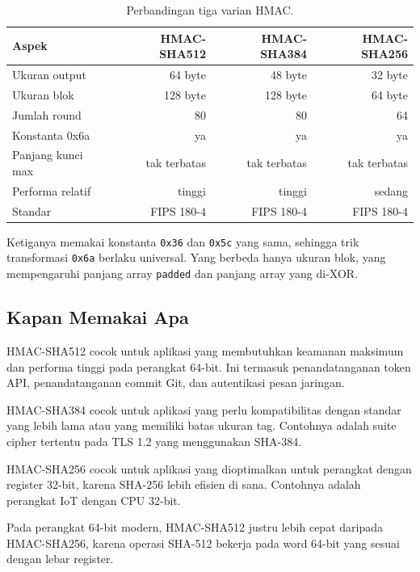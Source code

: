 \documentclass[11pt,a4paper]{article}
\begin{document}
\begin{table}[H]
	\centering
	\caption{Perbandingan tiga varian HMAC.}
	\label{tab:hmac-variants}
	\small
	\begin{tabularx}{\textwidth}{l r r r}
		\toprule
		Aspek             & HMAC-SHA512  & HMAC-SHA384  & HMAC-SHA256  \\
		\midrule
		Ukuran output     & 64 byte      & 48 byte      & 32 byte      \\
		Ukuran blok       & 128 byte     & 128 byte     & 64 byte      \\
		Jumlah round      & 80           & 80           & 64           \\
		Konstanta 0x6a    & ya           & ya           & ya           \\
		Panjang kunci max & tak terbatas & tak terbatas & tak terbatas \\
		Performa relatif  & tinggi       & tinggi       & sedang       \\
		Standar           & FIPS 180-4   & FIPS 180-4   & FIPS 180-4   \\
		\bottomrule
	\end{tabularx}
\end{table}

Ketiganya memakai konstanta \texttt{0x36} dan \texttt{0x5c} yang sama, sehingga trik transformasi \texttt{0x6a} berlaku universal. Yang berbeda hanya ukuran blok, yang mempengaruhi panjang array \texttt{padded} dan panjang array yang di-XOR.

\subsection{Kapan Memakai Apa}

HMAC-SHA512 cocok untuk aplikasi yang membutuhkan keamanan maksimum dan performa tinggi pada perangkat 64-bit. Ini termasuk penandatanganan token API, penandatanganan commit Git, dan autentikasi pesan jaringan.

HMAC-SHA384 cocok untuk aplikasi yang perlu kompatibilitas dengan standar yang lebih lama atau yang memiliki batas ukuran tag. Contohnya adalah suite cipher tertentu pada TLS 1.2 yang menggunakan SHA-384.

HMAC-SHA256 cocok untuk aplikasi yang dioptimalkan untuk perangkat dengan register 32-bit, karena SHA-256 lebih efisien di sana. Contohnya adalah perangkat IoT dengan CPU 32-bit.

Pada perangkat 64-bit modern, HMAC-SHA512 justru lebih cepat daripada HMAC-SHA256, karena operasi SHA-512 bekerja pada word 64-bit yang sesuai dengan lebar register.
\end{document}
